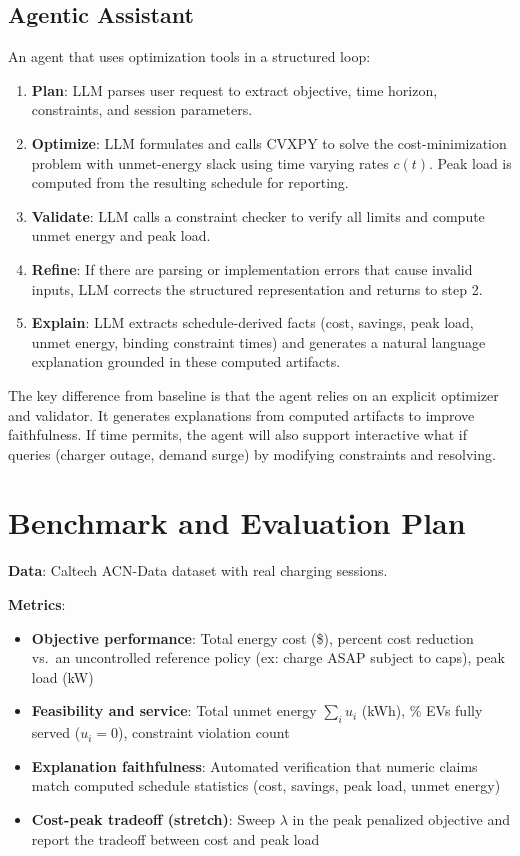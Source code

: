 \documentclass{article}
\begin{document}
\subsection{Agentic Assistant}
An agent that uses optimization tools in a structured loop:
\begin{enumerate}
  \item \textbf{Plan}: LLM parses user request to extract objective, time horizon, constraints, and session parameters.
  \item \textbf{Optimize}: LLM formulates and calls CVXPY to solve the cost-minimization problem with unmet-energy slack using time varying rates $c(t)$. Peak load is computed from the resulting schedule for reporting.
  \item \textbf{Validate}: LLM calls a constraint checker to verify all limits and compute unmet energy and peak load.
  \item \textbf{Refine}: If there are parsing or implementation errors that cause invalid inputs, LLM corrects the structured representation and returns to step 2.
  \item \textbf{Explain}: LLM extracts schedule-derived facts (cost, savings, peak load, unmet energy, binding constraint times) and generates a natural language explanation grounded in these computed artifacts.
\end{enumerate}

The key difference from baseline is that the agent relies on an explicit optimizer and validator. It generates explanations from computed artifacts to improve faithfulness. If time permits, the agent will also support interactive what if queries (charger outage, demand surge) by modifying constraints and resolving.

\section{Benchmark and Evaluation Plan}
\textbf{Data}: Caltech ACN-Data dataset \cite{acndata} with real charging sessions.

\textbf{Metrics}:
\begin{itemize}
  \item \textbf{Objective performance}: Total energy cost (\$), percent cost reduction vs.\ an uncontrolled reference policy (ex: charge ASAP subject to caps), peak load (kW)
  \item \textbf{Feasibility and service}: Total unmet energy $\sum_i u_i$ (kWh), \% EVs fully served ($u_i=0$), constraint violation count
  \item \textbf{Explanation faithfulness}: Automated verification that numeric claims match computed schedule statistics (cost, savings, peak load, unmet energy)
  \item \textbf{Cost-peak tradeoff (stretch)}: Sweep $\lambda$ in the peak penalized objective and report the tradeoff between cost and peak load
\end{itemize}
\end{document}
